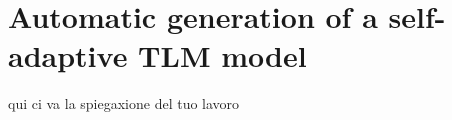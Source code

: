 

\chapter[Self-adaptive TLM model]{Automatic generation of a self-adaptive TLM model}\label{chap5:Automatic}
qui ci va la spiegaxione del tuo lavoro

